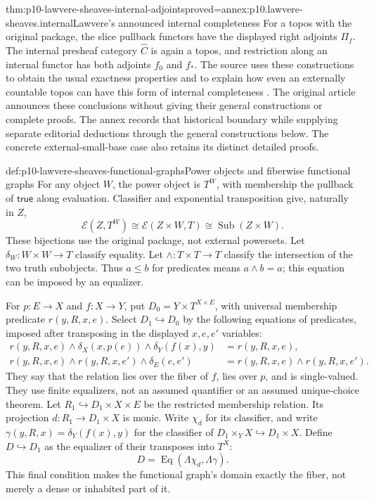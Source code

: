 \begin{hbtheorem}{thm:p10-lawvere-sheaves-internal-adjoints}{proved=annex:p10.lawvere-sheaves.internal}{Lawvere's announced internal completeness}
For a topos with the original package, the slice pullback functors have
the displayed right adjoints \(\Pi_f\).  The internal presheaf
category \(\widehat C\) is again a topos, and restriction along an
internal functor has both adjoints \(f_0\) and \(f_*\).
The source uses these constructions to obtain the usual exactness
properties and to explain how even an externally countable topos can
have this form of internal completeness \cite[p.~330]{Lawvere1970}.
The original article announces these conclusions without giving their
general constructions or complete proofs.  The annex records that
historical boundary while supplying separate editorial deductions
through the general constructions below.  The concrete
external-small-base case also retains its distinct detailed proofs.
\end{hbtheorem}

\begin{hbdefinition}{def:p10-lawvere-sheaves-functional-graphs}{Power objects and fiberwise functional graphs}
For any object \(W\), the power object is \(T^W\), with
membership the pullback of \(\mathsf{true}\) along evaluation.
Classifier and exponential transposition give, naturally in \(Z\),
\[
 \mathcal E(Z,T^W)\cong\mathcal E(Z\times W,T)
                         \cong\operatorname{Sub}(Z\times W).
\]
These bijections use the original package, not external powersets.
Let \(\delta_W:W\times W\to T\) classify equality.  Let
\(\land:T\times T\to T\) classify the intersection of the
two truth subobjects.  Thus \(a\leq b\) for predicates means
\(a\land b=a\); this equation can be imposed by an equalizer.

For \(p:E\to X\) and \(f:X\to Y\), put
\(D_0=Y\times T^{X\times E}\), with universal membership
predicate \(r(y,R,x,e)\).  Select \(D_1\hookrightarrow D_0\)
by the following equations of predicates, imposed after transposing
in the displayed \(x,e,e'\) variables:
\[
\begin{aligned}
 r(y,R,x,e)\land
   \delta_X(x,p(e))\land\delta_Y(f(x),y)&=r(y,R,x,e),\\
 r(y,R,x,e)\land r(y,R,x,e')\land\delta_E(e,e')
                    &=r(y,R,x,e)\land r(y,R,x,e').
\end{aligned}
\]
They say that the relation lies over the fiber of \(f\), lies
over \(p\), and is single-valued.  They use finite equalizers,
not an assumed quantifier or an assumed unique-choice theorem.
Let \(R_1\hookrightarrow D_1\times X\times E\) be the
restricted membership relation.  Its projection
\(d:R_1\to D_1\times X\) is monic.  Write \(\chi_d\)
for its classifier, and write
\(\gamma(y,R,x)=\delta_Y(f(x),y)\) for the classifier of
\(D_1\times_Y X\hookrightarrow D_1\times X\).
Define \(D\hookrightarrow D_1\) as the equalizer of their
transposes into \(T^X\):
\[
                    D=\operatorname{Eq}
                       (\Lambda\chi_d,\Lambda\gamma).
\]
This final condition makes the functional graph's domain exactly
the fiber, not merely a dense or inhabited part of it.
\end{hbdefinition}

